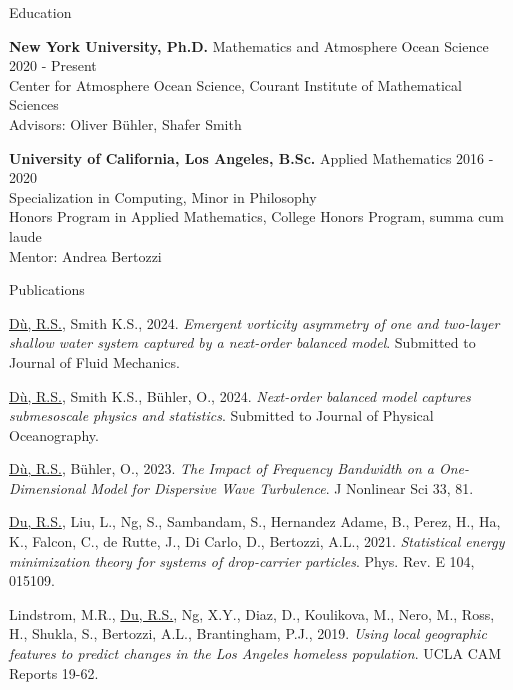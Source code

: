 \documentclass{resume} %
\begin{document}

\begin{rSection}{Education}

{\bf New York University, Ph.D.} Mathematics and Atmosphere Ocean Science \hfill {2020 - Present} \\
Center for Atmosphere Ocean Science, Courant Institute of Mathematical Sciences\\
Advisors: Oliver B\"uhler, Shafer Smith

{\bf University of California, Los Angeles, B.Sc.} Applied Mathematics \hfill {2016 - 2020} \\
Specialization in Computing, Minor in Philosophy\\
Honors Program in Applied Mathematics, College Honors Program, summa cum laude\\
Mentor: Andrea Bertozzi


\end{rSection}


\begin{rSection}{Publications}
\begin{etaremune}
    \item \underline{D\`u, R.S.}, Smith K.S., 2024. \textit{Emergent vorticity asymmetry of one and two-layer shallow water system captured by a next-order balanced model}. Submitted to Journal of Fluid Mechanics.
    \item \underline{D\`u, R.S.}, Smith K.S., Bühler, O., 2024. \textit{Next-order balanced model captures submesoscale physics and statistics}. Submitted to Journal of Physical Oceanography.
    \item \underline{D\`u, R.S.}, B\"uhler, O., 2023. \textit{The Impact of Frequency Bandwidth on a One-Dimensional Model for Dispersive Wave Turbulence}. J Nonlinear Sci 33, 81.
    \item \underline{Du, R.S.}, Liu, L., Ng, S., Sambandam, S., Hernandez Adame, B., Perez, H., Ha, K., Falcon, C., de Rutte, J., Di Carlo, D., Bertozzi, A.L., 2021. \textit{Statistical energy minimization theory for systems of drop-carrier particles}. Phys. Rev. E 104, 015109.
    \item Lindstrom, M.R., \underline{Du, R.S.}, Ng, X.Y., Diaz, D., Koulikova, M., Nero, M., Ross, H., Shukla, S., Bertozzi, A.L., Brantingham, P.J., 2019. \textit{Using local geographic features to predict changes in the Los Angeles homeless population}. UCLA CAM Reports 19-62.
\end{etaremune}
\end{rSection}
\end{document}
